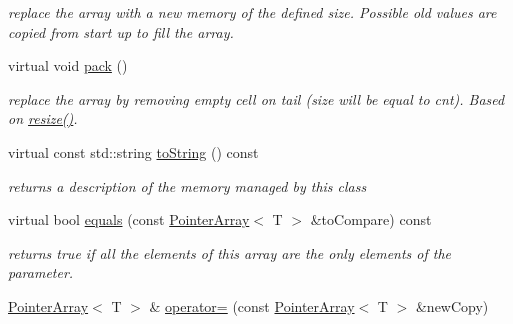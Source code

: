 \begin{DoxyCompactItemize}
\begin{DoxyCompactList}\small\item\em replace the array with a new memory of the defined size. Possible old values are copied from start up to fill the array. \end{DoxyCompactList}\item 
\hypertarget{classplist_1_1PointerArray_a183074f6dffc9fdef2a1304fdac01601}{virtual void \hyperlink{classplist_1_1PointerArray_a183074f6dffc9fdef2a1304fdac01601}{pack} ()}\label{classplist_1_1PointerArray_a183074f6dffc9fdef2a1304fdac01601}

\begin{DoxyCompactList}\small\item\em replace the array by removing empty cell on tail (size will be equal to cnt). Based on \hyperlink{classplist_1_1PointerArray_a029b375c7e17f2c08e8d6a3ee486f8fe}{resize()}. \end{DoxyCompactList}\item 
\hypertarget{classplist_1_1PointerArray_adbfcc2925aca65a903cb2d13b5439601}{virtual const std\-::string \hyperlink{classplist_1_1PointerArray_adbfcc2925aca65a903cb2d13b5439601}{to\-String} () const }\label{classplist_1_1PointerArray_adbfcc2925aca65a903cb2d13b5439601}

\begin{DoxyCompactList}\small\item\em returns a description of the memory managed by this class \end{DoxyCompactList}\item 
\hypertarget{classplist_1_1PointerArray_a55476b79cea967f390eec0093a8338c1}{virtual bool \hyperlink{classplist_1_1PointerArray_a55476b79cea967f390eec0093a8338c1}{equals} (const \hyperlink{classplist_1_1PointerArray}{Pointer\-Array}$<$ T $>$ \&to\-Compare) const }\label{classplist_1_1PointerArray_a55476b79cea967f390eec0093a8338c1}

\begin{DoxyCompactList}\small\item\em returns true if all the elements of this array are the only elements of the parameter. \end{DoxyCompactList}\item 
\hypertarget{classplist_1_1PointerArray_abb4dd2e3178e5170390901d2f0ecaa72}{\hyperlink{classplist_1_1PointerArray}{Pointer\-Array}$<$ T $>$ \& \hyperlink{classplist_1_1PointerArray_abb4dd2e3178e5170390901d2f0ecaa72}{operator=} (const \hyperlink{classplist_1_1PointerArray}{Pointer\-Array}$<$ T $>$ \&new\-Copy)}\label{classplist_1_1PointerArray_abb4dd2e3178e5170390901d2f0ecaa72}


\end{DoxyCompactItemize}
